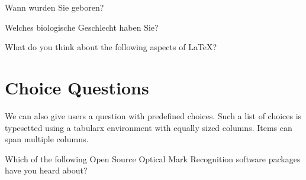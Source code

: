 \documentclass[
  german,
  globalid=Inventionate,
  print_questionnaire_id,
  oneside,
  pagemark,
  stamp]{sdaps}
\newcommand{\seperate}[1][0.3]{\vspace{#1cm}\noindent\makebox[\linewidth]{\rule{\textwidth}{0.5pt}}\vspace{#1cm}}
\begin{document}
\begin{questionnaire}
	\begin{choicequestion}[6]{Wann wurden Sie geboren?}
    \end{choicequestion}

    \seperate

    \begin{choicequestion}[1]{Welches biologische Geschlecht haben Sie?}
    \end{choicequestion}

    \seperate

   \setcounter{markcheckboxcount}{7}


   \seperate

   \setcounter{markcheckboxcount}{10}

    \begin{markgroup}{What do you think about the following aspects of \LaTeX?}
    \end{markgroup}

    \section{Choice Questions}
    We can also give users a question with predefined choices. Such a list
    of choices is typesetted using a tabularx environment with equally
    sized columns. Items can span multiple columns.

    \begin{choicequestion}[3]{Which of the following Open Source
                              Optical Mark Recognition software
                              packages have you heard about?}

    \end{choicequestion}


\end{questionnaire}
\end{document}
